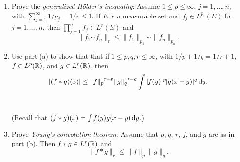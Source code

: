 \begin{problem}
\begin{enumerate}[label=(\alph*),noitemsep]
\item Prove the \emph{generalized Hölder's inequality}: Assume
  $1\leq p\leq\infty$, $j=1,\dotsc,n$, with
  $\sum_{j=1}^\infty 1/p_j=1/r\leq 1$. If $E$ is a measurable set and
  $f_j\in L^{p_j}(E)$ for $j=1,\dotsc,n$, then
  $\prod_{j=1}^n f_j\in L^r(E)$ and
    \[
      \|f_1\dotsm f_n\|_r\leq\|f_1\|_{p_1}\dotsm\|f_n\|_{p_n}.
    \]
\item Use part (a) to show that that if $1\leq p,q,r\leq\infty$, with
  $1/p+1/q=1/r+1$, $f\in L^p(\mathbb{R})$, and $g\in L^p(\mathbb{R})$, then
\[
|(f*g)(x)|\leq{\|f\|_p}^{r-p}{\|g\|_q}^{r-q}\int|f(y)|^p|g(x-y)|^q\mathop{}\!\mathrm{d} y.
\]
\\\\
(Recall that $(f*g)(x)=\int f(y)g(x-y)\mathop{}\!\mathrm{d} y$.)
\item Prove \emph{Young's convolution theorem}: Assume that $p$, $q$, $r$,
  $f$, and $g$ are as in part (b). Then $f*g\in L^r(\mathbb{R})$ and
  \[
    \|f*g\|_r\leq\|f\|_p\|g\|_q.
  \]
\end{enumerate}
\end{problem}
\begin{solution}
\end{solution}

